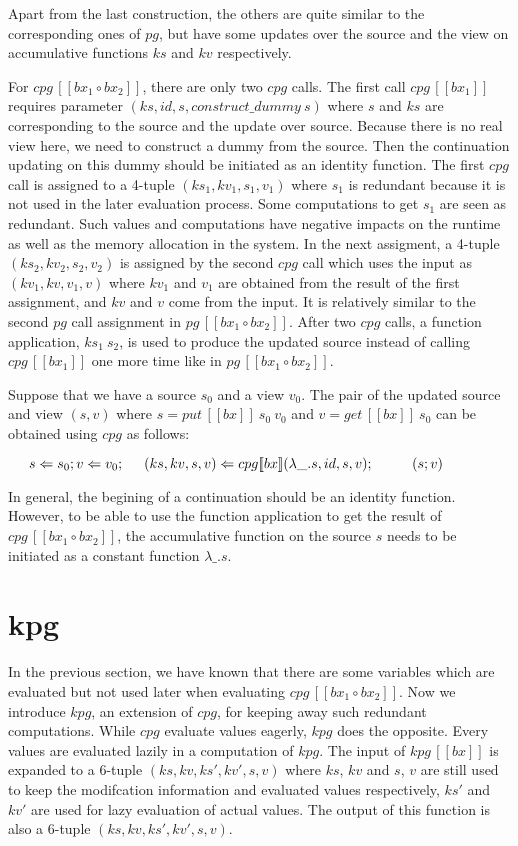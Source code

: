 \documentclass[runningheads]{llncs}
\newcommand{\tab}{\hspace*{5mm}}
\newcommand{\qtab}{\hspace*{5mm} \ \quad}
\newcommand{\putbx}[3]{put \, [\![#1]\!] \ #2 \ #3}
\newcommand{\getbx}[2]{get \, [\![#1]\!] \ #2}
\newcommand{\pginline}[1]{pg \, [\![#1]\!]}
\newcommand{\cpg}[5]{cpg [\![#1]\!] (#2, #3, #4, #5)}
\newcommand{\cpginline}[1]{cpg \, [\![#1]\!]}
\newcommand{\kpginline}[1]{kpg \, [\![#1]\!]}
\begin{document}
Apart from the last construction, the others are quite similar to the corresponding ones of $pg$, but have some updates over the source and the view on accumulative functions $ks$ and $kv$ respectively.

For $\cpginline{bx_1 \circ bx_2}$, there are only two $cpg$ calls. The first call $\cpginline{bx_1}$ requires parameter $(ks, id, s, construct\_dummy \ s)$ where $s$ and $ks$ are corresponding to the source and the update over source. Because there is no real view here, we need to construct a dummy from the source. Then the continuation updating on this dummy should be initiated as an identity function. The first $cpg$ call is assigned to a 4-tuple $(ks_1, kv_1, s_1, v_1)$ where $s_1$ is redundant because it is not used in the later evaluation process. Some computations to get $s_1$ are seen as redundant. Such values and computations have negative impacts on the runtime as well as the memory allocation in the system. In the next assigment, a 4-tuple $(ks_2, kv_2, s_2, v_2)$ is assigned by the second $cpg$ call which uses the input as $(kv_1, kv, v_1, v)$ where $kv_1$ and $v_1$ are obtained from the result of the first assignment, and $kv$ and $v$ come from the input. It is relatively similar to the second $pg$ call assignment in $\pginline{bx_1 \circ bx_2}$. After two $cpg$ calls, a function application, $ks_1 \ s_2$, is used to produce the updated source instead of calling $\cpginline{bx_1}$ one more time like in $\pginline{bx_1 \circ bx_2}$.

Suppose that we have a source $s_0$ and a view $v_0$. The pair of the updated source and view $(s, v)$ where $s = \putbx{bx}{s_0}{v_0}$ and $v = \getbx{bx}{s_0}$ can be obtained using $cpg$ as follows:

    $\tab s \Leftarrow s_0; v \Leftarrow v_0;\\
    \tab (ks, kv, s, v) \Leftarrow \cpg{bx}{\lambda \_.s}{id}{s}{v};\\
        \qtab (s; v)$

In general, the begining of a continuation should be an identity function. However, to be able to use the function application to get the result of $\cpginline{bx_1 \circ bx_2}$, the accumulative function on the source $s$ needs to be initiated as a constant function $\lambda \_.s$.

\section{kpg}

In the previous section, we have known that there are some variables which are evaluated but not used later when evaluating $\cpginline{bx_1 \circ bx_2}$. Now we introduce $kpg$, an extension of $cpg$, for keeping away such redundant computations. 
While $cpg$ evaluate values eagerly, $kpg$ does the opposite. Every values are evaluated lazily in a computation of $kpg$. The input of $\kpginline{bx}$ is expanded to a 6-tuple $(ks, kv, ks', kv', s, v)$ where $ks$, $kv$ and $s$, $v$ are still used to keep the modifcation information and evaluated values respectively, $ks'$ and $kv'$ are used for lazy evaluation of actual values. The output of this function is also a 6-tuple $(ks, kv, ks', kv', s, v)$.\\
\end{document}

